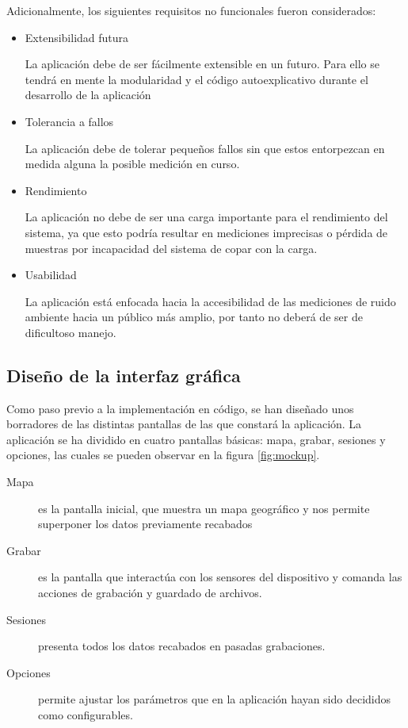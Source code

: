Adicionalmente, los siguientes requisitos no funcionales fueron considerados:

\begin{itemize}
\item Extensibilidad futura

La aplicación debe de ser fácilmente extensible en un futuro. Para ello se tendrá en mente la modularidad y el código autoexplicativo durante el desarrollo de la aplicación 

\item Tolerancia a fallos

La aplicación debe de tolerar pequeños fallos sin que estos entorpezcan en medida alguna la posible medición en curso.

\item Rendimiento

La aplicación no debe de ser una carga importante para el rendimiento del sistema, ya que esto podría resultar en mediciones imprecisas o pérdida de muestras por incapacidad del sistema de copar con la carga.

\item Usabilidad

La aplicación está enfocada hacia la accesibilidad de las mediciones de ruido ambiente hacia un público más amplio, por tanto no deberá de ser de dificultoso manejo.

\end{itemize}
\subsection{Diseño de la interfaz gráfica}

Como paso previo a la implementación en código, se han diseñado unos borradores de las distintas pantallas de las que constará la aplicación. La aplicación se ha dividido en cuatro pantallas básicas: mapa, grabar, sesiones y opciones, las cuales se pueden observar en la figura \ref{fig:mockup}.

\begin{description}
\item[Mapa] es la pantalla inicial, que muestra un mapa geográfico y nos permite superponer los datos previamente recabados
\item[Grabar] es la pantalla que interactúa con los sensores del dispositivo y comanda las acciones de grabación y guardado de archivos.
\item[Sesiones] presenta todos los datos recabados en pasadas grabaciones.
\item[Opciones] permite ajustar los parámetros que en la aplicación hayan sido decididos como configurables.
\end{description} 

